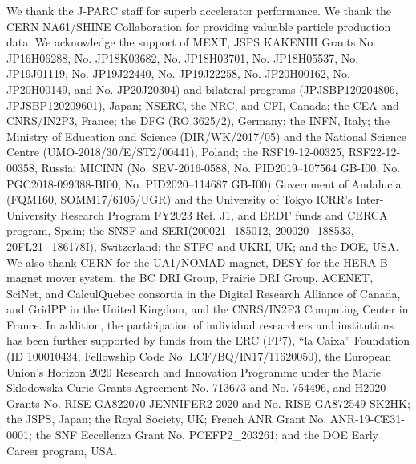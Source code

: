 \documentclass[%
 reprint,
 amsmath,amssymb,
 aps,
]{revtex4-2}
\begin{document}
We thank the J-PARC staff for superb accelerator performance. We thank the CERN NA61/SHINE Collaboration for providing valuable particle production data. We acknowledge the support of MEXT, JSPS KAKENHI Grants No. JP16H06288, No. JP18K03682,
No. JP18H03701, No. JP18H05537, No. JP19J01119, No. JP19J22440, No. JP19J22258, No. JP20H00162, No. JP20H00149, and No. JP20J20304) and bilateral programs (JPJSBP120204806, JPJSBP120209601), Japan; NSERC, the NRC, and CFI, Canada; the CEA and
CNRS/IN2P3, France; the DFG (RO 3625/2), Germany; the INFN, Italy; the Ministry of Education and Science (DIR/WK/2017/05) and the National Science Centre (UMO-2018/30/E/ST2/00441), Poland; the RSF19-12-00325, RSF22-12-00358, Russia; MICINN (No. SEV-2016-0588, No. PID2019–107564 GB-I00, No. PGC2018-099388-BI00, No. PID2020–114687 GB-I00) Government of Andalucia (FQM160, SOMM17/6105/UGR) and the University of Tokyo ICRR’s Inter-University Research Program FY2023 Ref. J1, and ERDF funds and CERCA program, Spain; the SNSF and SERI(200021\_185012, 200020\_188533, 20FL21\_186178I), Switzerland; the STFC and UKRI, UK; and the DOE, USA. We also thank CERN for the UA1/NOMAD magnet, DESY for the HERA-B magnet mover system, the BC DRI Group, Prairie DRI Group, ACENET, SciNet, and CalculQuebec consortia in the Digital Research Alliance of Canada, and GridPP in the United Kingdom, and the CNRS/IN2P3 Computing Center in France. In addition, the participation of individual researchers and institutions has been further supported by funds from the ERC (FP7), “la Caixa” Foundation (ID 100010434, Fellowship Code No. LCF/BQ/IN17/11620050), the European Union’s Horizon 2020 Research and Innovation Programme under
the Marie Sklodowska-Curie Grants Agreement No. 713673  and No. 754496, and H2020 Grants No. RISE-GA822070-JENNIFER2 2020 and No. RISE-GA872549-SK2HK; the JSPS, Japan; the Royal Society, UK; French ANR Grant No. ANR-19-CE31-0001; the SNF Eccellenza Grant No. PCEFP2\_203261; and the DOE Early Career program, USA.
\appendix


%
\end{document}
